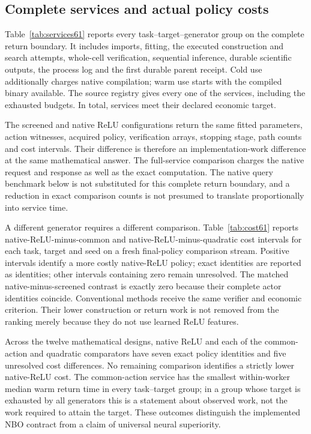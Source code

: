 \subsection{Complete services and actual policy costs}
Table~\ref{tab:services61} reports every task--target--generator group on the complete return boundary. It includes imports, fitting, the executed construction and search attempts, whole-cell verification, sequential inference, durable scientific outputs, the process log and the first durable parent receipt. Cold use additionally charges native compilation; warm use starts with the compiled binary available. The source registry gives every one of the \NBOServices{} services, including the \NBOExhausted{} exhausted budgets. In total, \NBOAttained{} services meet their declared economic target.




The screened and native ReLU configurations return the same fitted parameters, action witnesses, acquired policy, verification arrays, stopping stage, path counts and cost intervals. Their difference is therefore an implementation-work difference at the same mathematical answer. The full-service comparison charges the native request and response as well as the exact computation. The native query benchmark below is not substituted for this complete return boundary, and a reduction in exact comparison counts is not presumed to translate proportionally into service time.

A different generator requires a different comparison. Table~\ref{tab:cost61} reports native-ReLU-minus-common and native-ReLU-minus-quadratic cost intervals for each task, target and seed on a fresh final-policy comparison stream. Positive intervals identify a more costly native-ReLU policy; exact identities are reported as identities; other intervals containing zero remain unresolved. The matched native-minus-screened contrast is exactly zero because their complete actor identities coincide. Conventional methods receive the same verifier and economic criterion. Their lower construction or return work is not removed from the ranking merely because they do not use learned ReLU features.



Across the twelve mathematical designs, native ReLU and each of the common-action and quadratic comparators have seven exact policy identities and five unresolved cost differences. No remaining comparison identifies a strictly lower native-ReLU cost. The common-action service has the smallest within-worker median warm return time in every task--target group; in a group whose target is exhausted by all generators this is a statement about observed work, not the work required to attain the target. These outcomes distinguish the implemented NBO contract from a claim of universal neural superiority.

